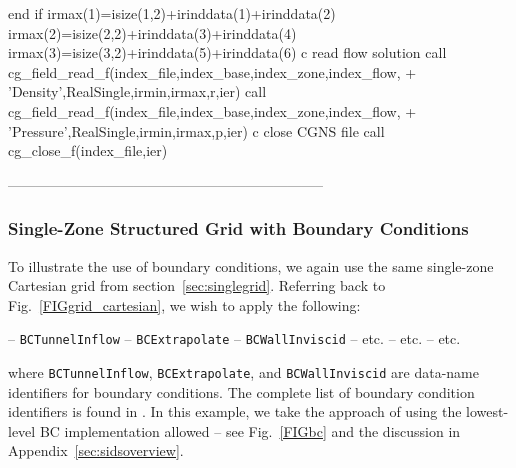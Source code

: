 \documentclass[12pt]{article}
\begin{document}
{\newline\indent      end if
\newline\indent      irmax(1)=isize(1,2)+irinddata(1)+irinddata(2)
\newline\indent      irmax(2)=isize(2,2)+irinddata(3)+irinddata(4)
\newline\indent      irmax(3)=isize(3,2)+irinddata(5)+irinddata(6)
\newline c   read flow solution
\newline\indent      call cg\_field\_read\_f(index\_file,index\_base,index\_zone,index\_flow,
\newline + \indent 'Density',RealSingle,irmin,irmax,r,ier)
\newline\indent      call cg\_field\_read\_f(index\_file,index\_base,index\_zone,index\_flow,
\newline + \indent 'Pressure',RealSingle,irmin,irmax,p,ier)
\newline c  close CGNS file
\newline\indent      call cg\_close\_f(index\_file,ier)}

--------------------------------------------------------------------

\subsubsection{Single-Zone Structured Grid with Boundary Conditions} \label{sec:bcstruct}

To illustrate the use of boundary conditions, we again use the
same single-zone Cartesian grid from section~\ref{sec:singlegrid}.
Referring back to Fig.~\ref{FIGgrid_cartesian}, we wish to apply
the following:

 -- {\tt BCTunnelInflow}
\newline{} -- {\tt BCExtrapolate}
\newline{} -- {\tt BCWallInviscid}
\newline{} -- etc.
\newline{} -- etc.
\newline{} -- etc.

\noindent where {\tt BCTunnelInflow}, {\tt BCExtrapolate}, and
{\tt BCWallInviscid} are data-name identifiers for boundary 
conditions.  The complete list of boundary condition identifiers
is found in \cite{ALLMARAS}.  In this example, we take the approach of 
using the lowest-level BC implementation allowed -- see
Fig.~\ref{FIGbc} and the discussion in Appendix~\ref{sec:sidsoverview}.
\end{document}
